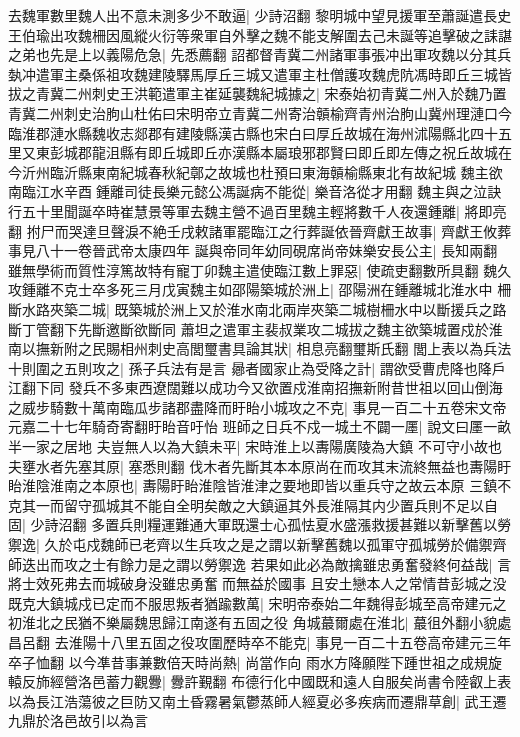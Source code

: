 去魏軍數里魏人出不意未測多少不敢逼|{
	少詩沼翻}
黎明城中望見援軍至蕭誕遣長史王伯瑜出攻魏柵因風縱火衍等衆軍自外擊之魏不能支解圍去己未誕等追擊破之誄諶之弟也先是上以義陽危急|{
	先悉薦翻}
詔都督青冀二州諸軍事張冲出軍攻魏以分其兵埶冲遣軍主桑係祖攻魏建陵驛馬厚丘三城又遣軍主杜僧護攻魏虎阬馮時即丘三城皆拔之青冀二州刺史王洪範遣軍主崔延襲魏紀城據之|{
	宋泰始初青冀二州入於魏乃置青冀二州刺史治朐山杜佑曰宋明帝立青冀二州寄治贑榆齊青州治朐山冀州理漣口今臨淮郡漣水縣魏收志郯郡有建陵縣漢古縣也宋白曰厚丘故城在海州沭陽縣北四十五里又東彭城郡龍沮縣有即丘城即丘亦漢縣本屬琅邪郡賢曰即丘即左傳之祝丘故城在今沂州臨沂縣東南紀城春秋紀鄣之故城也杜預曰東海贑榆縣東北有故紀城}
魏主欲南臨江水辛酉鍾離司徒長樂元懿公馮誕病不能從|{
	樂音洛從才用翻}
魏主與之泣訣行五十里聞誕卒時崔慧景等軍去魏主營不過百里魏主輕將數千人夜還鍾離|{
	將即亮翻}
拊尸而哭達旦聲淚不絶壬戌敕諸軍罷臨江之行葬誕依晉齊獻王故事|{
	齊獻王攸葬事見八十一卷晉武帝太康四年}
誕與帝同年幼同硯席尚帝妹樂安長公主|{
	長知兩翻}
雖無學術而質性淳篤故特有寵丁卯魏主遣使臨江數上罪惡|{
	使疏吏翻數所具翻}
魏久攻鍾離不克士卒多死三月戊寅魏主如邵陽築城於洲上|{
	邵陽洲在鍾離城北淮水中}
柵斷水路夾築二城|{
	既築城於洲上又於淮水南北兩岸夾築二城樹柵水中以斷援兵之路斷丁管翻下先斷邀斷欲斷同}
蕭坦之遣軍主裴叔業攻二城拔之魏主欲築城置戍於淮南以撫新附之民賜相州刺史高閭璽書具論其狀|{
	相息亮翻璽斯氏翻}
閭上表以為兵法十則圍之五則攻之|{
	孫子兵法有是言}
曏者國家止為受降之計|{
	謂欲受曹虎降也降戶江翻下同}
發兵不多東西遼闊難以成功今又欲置戍淮南招撫新附昔世祖以回山倒海之威步騎數十萬南臨瓜步諸郡盡降而盱眙小城攻之不克|{
	事見一百二十五卷宋文帝元嘉二十七年騎奇寄翻盱眙音吁怡}
班師之日兵不戍一城土不闢一㕓|{
	說文曰㕓一畝半一家之居地}
夫豈無人以為大鎮未平|{
	宋時淮上以夀陽廣陵為大鎮}
不可守小故也夫壅水者先塞其原|{
	塞悉則翻}
伐木者先斷其本本原尚在而攻其末流終無益也夀陽盱眙淮陰淮南之本原也|{
	夀陽盱眙淮陰皆淮津之要地即皆以重兵守之故云本原}
三鎮不克其一而留守孤城其不能自全明矣敵之大鎮逼其外長淮隔其内少置兵則不足以自固|{
	少詩沼翻}
多置兵則糧運難通大軍既還士心孤怯夏水盛漲救援甚難以新擊舊以勞禦逸|{
	久於屯戍魏師已老齊以生兵攻之是之謂以新擊舊魏以孤軍守孤城勞於備禦齊師迭出而攻之士有餘力是之謂以勞禦逸}
若果如此必為敵擒雖忠勇奮發終何益哉|{
	言將士效死弗去而城破身没雖忠勇奮而無益於國事}
且安土戀本人之常情昔彭城之没既克大鎮城戍已定而不服思叛者猶踰數萬|{
	宋明帝泰始二年魏得彭城至高帝建元之初淮北之民猶不樂屬魏思歸江南遂有五固之役}
角城蕞爾處在淮北|{
	蕞徂外翻小貌處昌呂翻}
去淮陽十八里五固之役攻圍歷時卒不能克|{
	事見一百二十五卷高帝建元三年卒子恤翻}
以今凖昔事兼數倍天時尚熱|{
	尚當作向}
雨水方降願陛下踵世祖之成規旋轅反斾經營洛邑蓄力觀釁|{
	釁許覲翻}
布德行化中國既和遠人自服矣尚書令陸叡上表以為長江浩蕩彼之巨防又南土昏霧暑氣鬱蒸師人經夏必多疾病而遷鼎草創|{
	武王遷九鼎於洛邑故引以為言}
